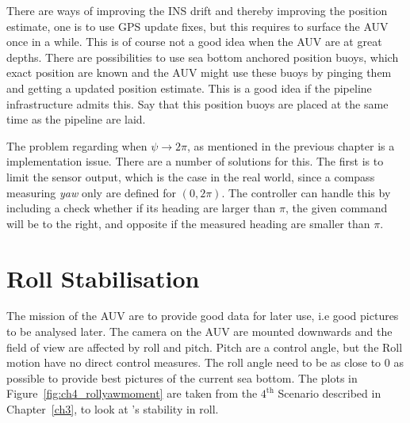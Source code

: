 	There are ways of improving the INS drift and thereby improving the position estimate, one is to use 
	GPS update fixes, but this requires to
	surface the AUV once in a while. This is of course not a good idea when the AUV are at great depths.
	There are possibilities to use sea bottom anchored position buoys, which exact position are known and
	the AUV might use these buoys by pinging them and getting a updated position estimate. This is a good
	idea if the pipeline infrastructure admits this. Say that this position buoys are placed at the same
	time as the pipeline are laid.

	The problem regarding when $\psi \rightarrow 2\pi$, as mentioned in the previous chapter is a
	implementation issue. There are a number of solutions for this.
	The first is to limit the sensor output, which is the case in the real world, since a compass
	measuring \textit{yaw} only are defined for $(0, 2 \pi)$. The controller can handle this by including
	a check whether if its heading are larger than $\pi$, the given command will be to the right, and
	opposite if the measured heading are smaller than $\pi$.



\section{Roll Stabilisation}
	The mission of the AUV are to provide good data for later use, i.e good pictures to be analysed later.
	The camera on the AUV are mounted downwards and the field of view are affected by roll and pitch.
	Pitch are a control angle, but the Roll motion have no direct control measures. The roll angle need to
	be as close to 0 as possible to provide best pictures of the current sea bottom.
	The plots in Figure~\ref{fig:ch4_rollyawmoment}
	are taken from the $4^{\mathrm{th}}$ Scenario described in Chapter~\ref{ch3}, to look at \hugin's 
	stability in roll.


